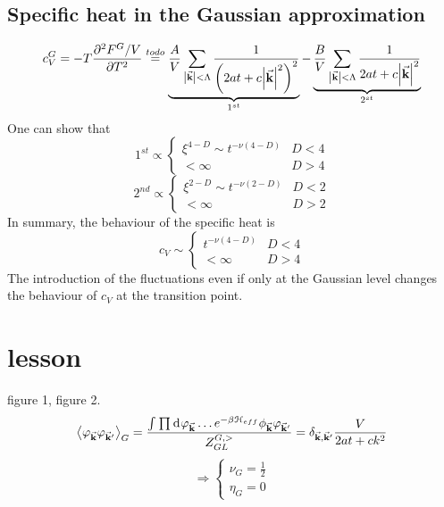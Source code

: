 \documentclass[../main/main.tex]{subfiles}
\begin{document}
\subsection{Specific heat in the Gaussian approximation}
\begin{equation}
  c_V^G = - T \pdv[2]{F^G/V}{T} \overset{to do}{=}   \underbrace{\frac{A}{V} \sum_{\abs{\va{k}} < \Lambda  }^{}
  \frac{1}{ \qty(2 a t + c \abs{\va{k}}^2 )^2}}_{1^{st}}
    - \underbrace{ \frac{B}{V} \sum_{\abs{\va{k}}< \Lambda  }^{} \frac{1}{2 a t + c \abs{\va{k}}^2 }}_{2^{st}}
\end{equation}
One can show that
\begin{equation}
1^{st} \propto
  \begin{cases}
   \xi ^{4-D} \sim t^{-\nu (4-D)}  & D < 4\\
  < \infty & D > 4
  \end{cases}
\end{equation}
\begin{equation}
2^{nd} \propto
  \begin{cases}
   \xi ^{2-D} \sim t^{-\nu (2-D)}  & D < 2\\
  < \infty & D > 2
  \end{cases}
\end{equation}
In summary, the behaviour of the specific heat is
\begin{equation}
  c_V \sim \begin{cases}
    t^{-\nu (4-D)} & D < 4 \\
    <\infty & D > 4
\end{cases}
\end{equation}
The introduction of the fluctuations even if only at the Gaussian level changes the behaviour of \( c_V \) at the transition point. 




\section{lesson}


figure 1, figure 2.
\begin{equation}
  \expval{\varphi _{\va{k}} \varphi _{\va{k}'}}_G = \frac{\int_{}^{} \prod_{}^{}   \dd[]{\varphi _{\va{k}}}  \dots e^{- \beta \mathcal{H}_{eff}}  \phi_{\va{k}} \varphi _{\va{k}'} }{Z_{GL}^{G,>}}
  = \delta _{\va{k},\va{k}'} \frac{V}{2 a t + c k^2}
\end{equation}
\begin{equation}
\Rightarrow
  \begin{cases}
   \nu _G = \frac{1}{2}\\
   \eta_G = 0
  \end{cases}
\end{equation}
\end{document}
